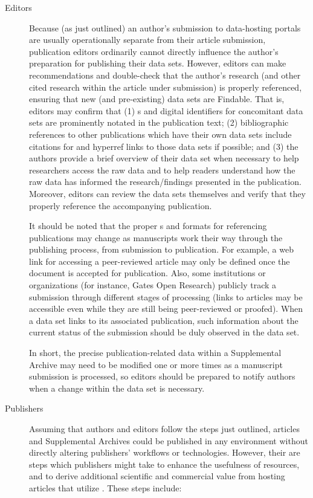 \documentclass[11pt,letterpaper]{article}
\newcommand{\ATexttclr}[1]{\textcolor{tcolor}{\textbf{#1}}}
\newcommand{\URL}{\resizebox{!}{7pt}{\AcronymText{URL}}}
\newcommand{\textscc}[1]{{\color{orr!35!black}{{%
						\fontfamily{Cabin-TLF}\fontseries{b}\selectfont{\textsc{\scriptsize{#1}}}}}}}
\newcommand{\AcronymText}[1]{{\textscc{#1}}}
\newcommand{\SDRF}{\resizebox{!}{8pt}{\ATexttclr{S}}\resizebox{!}{8pt}{\ATexttclr{DR%
\hspace{1pt}{\raisebox{-1pt}{\fontfamily{qhv}\fontseries{b}\selectfont{}\Large{F}}%
}}}}
\begin{document}
{{\begin{description}
\item[Editors]  Because (as just outlined) an author's submission 
to data-hosting portals are usually operationally separate 
from their article submission, publication 
editors ordinarily cannot directly influence the author's 
preparation for publishing their data sets.  However, 
editors can make recommendations and double-check that 
the author's research (and other cited research  
within the article under submission) is properly referenced, ensuring 
that new (and pre-existing) data sets are 
Findable.  That is, editors may confirm that (1) \URL{}s 
and digital identifiers for concomitant data sets are prominently 
notated in the publication text; (2) bibliographic 
references to other publications which have their own 
data sets include citations for and hyperref links to 
those data sets if possible; and (3) the authors provide 
a brief overview of their data set when necessary 
to help researchers access the raw data and to help 
readers understand how the raw data has informed the 
research/findings presented in the publication.  
Moreover, editors can review the data sets themselves 
and verify that they 
properly reference the accompanying publication. 

It should be noted that the proper \URL{}s and formats 
for referencing publications may change as manuscripts 
work their way through the publishing process, from 
submission to publication.  
For example, a web link for accessing a peer-reviewed 
article may only be defined once the document is 
accepted for publication.  Also, some institutions 
or organizations  
(for instance, Gates Open Research) 
publicly track a submission through different stages 
of processing (links to articles may be accessible  
even while they are still being peer-reviewed or proofed).  
When a data set links to its associated 
publication, such information about the current 
status of the submission should be duly observed in the 
data set.

In short, the precise publication-related data within a 
Supplemental Archive may need to be modified one 
or more times as a manuscript submission is processed, 
so editors should be prepared to notify authors when 
a change within the data set is necessary.

\item[Publishers]  Assuming that authors and 
editors follow the steps just outlined, 
articles and Supplemental Archives could be 
published in any environment without directly altering 
publishers' workflows or technologies.  
However, their are steps which publishers 
might take to enhance the usefulness of \SDRF{} 
resources, and to derive additional scientific 
and commercial value from hosting articles 
that utilize \SDRF{}.  These steps include:


\end{description}}}
\end{document}
